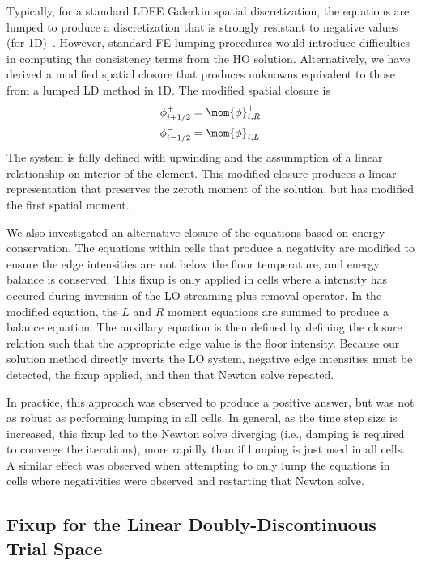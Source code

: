 Typically, for a standard LDFE Galerkin spatial discretization,
the equations are lumped to produce a discretization that is strongly resistant to
negative values (for 1D)~\cite{morel_ldtrt}. However, standard FE lumping
procedures would introduce difficulties in computing the consistency terms from the
HO solution.  Alternatively, we have derived a modified spatial closure that produces
unknowns equivalent to those from a lumped LD method in 1D.  The modified spatial closure
is
\begin{align}
    \phi_{i+1/2}^+ &= \mom{\phi}_{i,R}^+ \\
    \phi_{i-1/2}^- &= \mom{\phi}_{i,L}^- 
\end{align}
The system is fully defined with upwinding and the assunmption of a linear relationship on
interior of the element.  This modified closure produces a linear
representation that preserves the zeroth moment of the solution, but has modified the
first spatial moment.

We also investigated an alternative closure of the equations based on energy conservation.  
The equations within cells that produce a negativity are modified to ensure the edge
intensities are not below the floor temperature, and energy balance is
conserved.  This fixup is only applied in cells where a intensity has occured during
inversion of the LO streaming plus removal operator.  In the modified equation, the $L$
and $R$ moment equations are summed to produce a
balance equation.  The auxillary equation is then defined by defining the closure
relation such that the appropriate edge
value is the floor intensity.  Because our solution method directly inverts the LO system,
negative edge intensities must be detected, the fixup applied, and then that Newton solve
repeated.

In practice, this approach was observed to produce a positive answer, but was not as robust as performing
lumping in all cells.  In general, as the time step size is increased, this fixup led to the Newton
solve diverging (i.e., damping is required to converge the iterations), more rapidly than if lumping is
just used in all cells.  A similar effect was observed when attempting to only lump the
equations in cells where negativities were observed and restarting that Newton solve.

\subsection{Fixup for the Linear Doubly-Discontinuous Trial Space}

